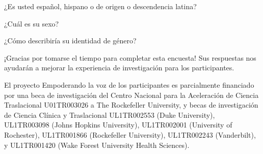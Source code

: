 \documentclass[spanish,pagemark,stamp,oneside,print_questionnaire_id]{sdapsclassic}
\begin{document}
\begin{questionnaire}
\begin{Form}
                        \begin{optionquestion}[singlechoice,cols=1]{¿Es usted español, hispano o de origen o descendencia latina?}\end{optionquestion}
                        \begin{optionquestion}[singlechoice,cols=1]{¿Cuál es su sexo?}\end{optionquestion}
                        \begin{optionquestion}[singlechoice,cols=1]{¿Cómo describiría su identidad de género?}\end{optionquestion}
                    \begin{info}
                        ¡Gracias por tomarse el tiempo para completar esta encuesta!  Sus respuestas nos ayudarán a mejorar la experiencia de investigación para los participantes.

El proyecto Empoderando la voz de los participantes es parcialmente financiado por una beca de investigación del Centro Nacional para la Aceleración de Ciencia Traslacional U01TR003026 a The Rockefeller University, y becas de investigación de Ciencia Clínica y Traslacional UL1TR002553 (Duke University), UL1TR003098 (Johns Hopkins University), UL1TR002001 (University of Rochester), UL1TR001866 (Rockefeller University), UL1TR002243 (Vanderbilt), y UL1TR001420 (Wake Forest University Health Sciences).
                    \end{info}
                \end{Form}
                \end{questionnaire}
            
\end{document}
